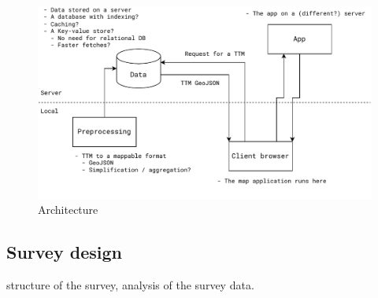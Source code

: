 \begin{figure}[H]
	\centering
	\includegraphics[width=1\textwidth]{images/architechture}
	\caption{Architecture}
	\label{fig:architechture}
\end{figure}





\subsection{Survey design}
structure of the survey,
analysis of the survey data.
